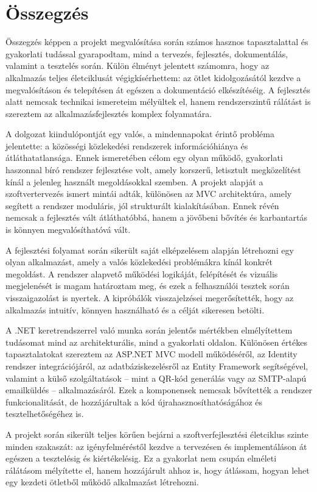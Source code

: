 \section{Összegzés}

Összegzés képpen a projekt megvalósítása során számos hasznos tapasztalattal és gyakorlati tudással gyarapodtam, mind a tervezés, fejlesztés, dokumentálás, valamint a tesztelés során. Külön élményt jelentett számomra, hogy az alkalmazás teljes életciklusát végigkísérhettem: az ötlet kidolgozásától kezdve a megvalósításon és telepítésen át egészen a dokumentáció elkészítéséig. A fejlesztés alatt nemcsak technikai ismereteim mélyültek el, hanem rendszerszintű rálátást is szereztem az alkalmazásfejlesztés komplex folyamatára.

A dolgozat kiindulópontját egy valós, a mindennapokat érintő probléma jelentette: a közösségi közlekedési rendszerek információhiánya és átláthatatlansága. Ennek ismeretében célom egy olyan működő, gyakorlati haszonnal bíró rendszer fejlesztése volt, amely korszerű, letisztult megközelítést kínál a jelenleg használt megoldásokkal szemben. A projekt alapját a szoftvertervezés ismert mintái adták, különösen az MVC architektúra, amely segített a rendszer moduláris, jól strukturált kialakításában. Ennek révén nemcsak a fejlesztés vált átláthatóbbá, hanem a jövőbeni bővítés és karbantartás is könnyen megvalósíthatóvá vált.

A fejlesztési folyamat során sikerült saját elképzelésem alapján létrehozni egy olyan alkalmazást, amely a valós közlekedési problémákra kínál konkrét megoldást. A rendszer alapvető működési logikáját, felépítését és vizuális megjelenését is magam határoztam meg, és ezek a felhasználói tesztek során visszaigazolást is nyertek. A kipróbálók visszajelzései megerősítették, hogy az alkalmazás intuitív, könnyen használható és a célját sikeresen betölti.

A .NET keretrendszerrel való munka során jelentős mértékben elmélyítettem tudásomat mind az architekturális, mind a gyakorlati oldalon. Különösen értékes tapasztalatokat szereztem az ASP.NET MVC modell működéséről, az Identity rendszer integrációjáról, az adatbáziskezelésről az Entity Framework segítségével, valamint a külső szolgáltatások – mint a QR-kód generálás vagy az SMTP-alapú emailküldés – alkalmazásáról. Ezek a komponensek nemcsak bővítették a rendszer funkcionalitását, de hozzájárultak a kód újrahasznosíthatóságához és tesztelhetőségéhez is.

A projekt során sikerült teljes körűen bejárni a szoftverfejlesztési életciklus szinte minden szakaszát: az igényfelméréstől kezdve a tervezésen és implementáláson át egészen a tesztelésig és kiértékelésig. Ez a gyakorlat nem csupán elméleti rálátásom mélyítette el, hanem hozzájárult ahhoz is, hogy átlássam, hogyan lehet egy kezdeti ötletből működő alkalmazást létrehozni. 

